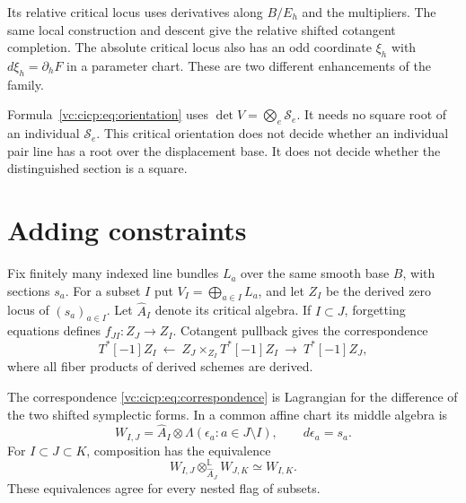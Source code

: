 Its relative critical locus uses derivatives along $B/E_h$
and the multipliers. The same local construction and descent
give the relative shifted cotangent completion.
The absolute critical locus also has an odd coordinate
$\xi_h$ with $d\xi_h=\partial_hF$ in a parameter chart.
These are two different enhancements of the family.

Formula~\eqref{vc:cicp:eq:orientation} uses
$\det V=\bigotimes_e\mathcal S_e$.
It needs no square root of an individual $\mathcal S_e$.
This critical orientation does not decide whether an individual
pair line has a root over the displacement base.
It does not decide whether the distinguished section is a square.

\section{Adding constraints}

Fix finitely many indexed line bundles $L_a$ over the same
smooth base $B$, with sections $s_a$. For a subset $I$ put
$V_I=\bigoplus_{a\in I}L_a$, and let $Z_I$ be the derived
zero locus of $(s_a)_{a\in I}$.
Let $\widehat A_I$ denote its critical algebra.
If $I\subset J$, forgetting equations defines
$f_{JI}:Z_J\to Z_I$. Cotangent pullback gives the correspondence
\begin{equation}\label{vc:cicp:eq:correspondence}
 T^*[-1]Z_I\ \longleftarrow\
 Z_J\mathbin{\times}_{Z_I}T^*[-1]Z_I
 \ \longrightarrow\ T^*[-1]Z_J,
\end{equation}
where all fiber products of derived schemes are derived.

\begin{theorem}\label{vc:cicp:thm:flags}
The correspondence \eqref{vc:cicp:eq:correspondence} is Lagrangian
for the difference of the two shifted symplectic forms.
In a common affine chart its middle algebra is
\begin{equation}\label{vc:cicp:eq:middle}
 W_{I,J}=\widehat A_I\otimes
          \Lambda(\epsilon_a:a\in J\setminus I),
 \qquad d\epsilon_a=s_a.
\end{equation}
For $I\subset J\subset K$, composition has the equivalence
\begin{equation}\label{vc:cicp:eq:composition}
 W_{I,J}\otimes^{\mathbb L}_{\widehat A_J}W_{J,K}
      \simeq W_{I,K}.
\end{equation}
These equivalences agree for every nested flag of subsets.
\end{theorem}

